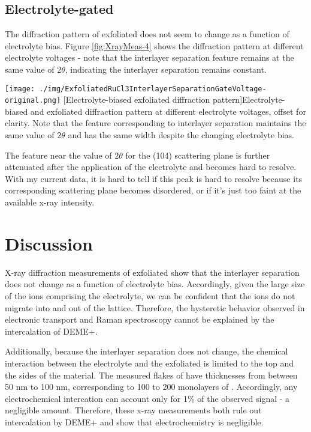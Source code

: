 \subsection{Electrolyte-gated \rucl}

The diffraction pattern of exfoliated \rucl does not seem to change as a function of electrolyte bias. Figure \ref{fig:XrayMeas-4} shows the diffraction pattern at different electrolyte voltages - note that the interlayer separation feature remains at the same value of $2\theta$, indicating the interlayer separation remains constant.

\begin{centering}
\texttt{[image: ./img/ExfoliatedRuCl3InterlayerSeparationGateVoltage-original.png]}
  \captionsetup{width=0.75\textwidth}
  [Electrolyte-biased exfoliated \rucl diffraction pattern]{Electrolyte-biased and exfoliated \rucl diffraction pattern at different electrolyte voltages, offset for clarity. Note that the feature corresponding to \rucl interlayer separation maintains the same value of $2\theta$ and has the same width despite the changing electrolyte bias.} 
  \label{fig:XrayMeas-4}
\end{centering}

The feature near the value of $2\theta$ for the (104) scattering plane is further attenuated after the application of the electrolyte and becomes hard to resolve. With my current data, it is hard to tell if this peak is hard to resolve because its corresponding scattering plane becomes disordered, or if it's just too faint at the available x-ray intensity.

\section{Discussion}

X-ray diffraction measurements of exfoliated \rucl show that the interlayer separation does not change as a function of electrolyte bias. Accordingly, given the large size of the ions comprising the electrolyte, we can be confident that the ions do not migrate into and out of the lattice. Therefore, the hysteretic behavior observed in electronic transport and Raman spectroscopy cannot be explained by the intercalation of DEME+.

Additionally, because the interlayer separation does not change, the chemical interaction between the electrolyte and the exfoliated \rucl is limited to the top and the sides of the material. The measured flakes of \rucl have thicknesses from between 50 nm to 100 nm, corresponding to 100 to 200 monolayers of \ruclnospace . Accordingly, any electrochemical intercation can account only for 1\% of the observed signal - a negligible amount. Therefore, these x-ray measurements both rule out intercalation by DEME+ and show that electrochemistry is negligible.

